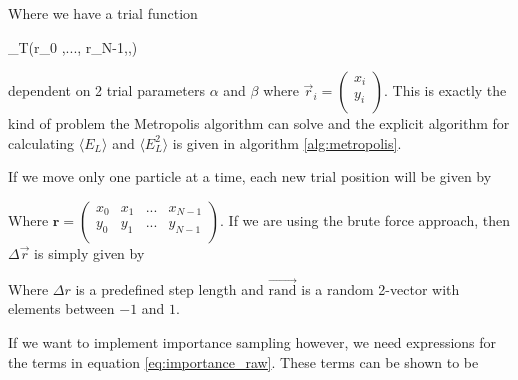 Where we have a trial function 

\eqs \Psi_T(\vec r_0 ,..., \vec r_{N-1},\alpha,\beta) \eqf

dependent on 2 trial parameters $\alpha$ and $\beta$
where $\vec r_i = \left ( \begin{matrix} x_i \\ y_i \\ \end{matrix} \right )$.
This is exactly the kind of problem the Metropolis algorithm can solve and the explicit algorithm for calculating $\langle E_L \rangle$ and $\langle E_L^2 \rangle$ is given in algorithm \ref{alg:metropolis}.



If we move only one particle at a time, each new trial position will be given by 

\eqs
{}
\eqf

Where $\mathbf{r} = \left ( \begin{matrix} x_0  & x_1 & ... & x_{N-1} \\ y_0  & y_1 & ... & y_{N-1} \\ \end{matrix}\right ) $. If we are using the brute force approach, then $\Delta \vec r$ is simply given by 

\eqs
{}
\eqf

Where $\Delta r$ is a predefined step length and $\vec {\textrm{rand}}$ is a random 2-vector with elements between $-1$ and $1$. 

If we want to implement importance sampling however, we need expressions for the terms in equation \ref{eq:importance_raw}.
These terms can be shown \cite{slides} to be 

